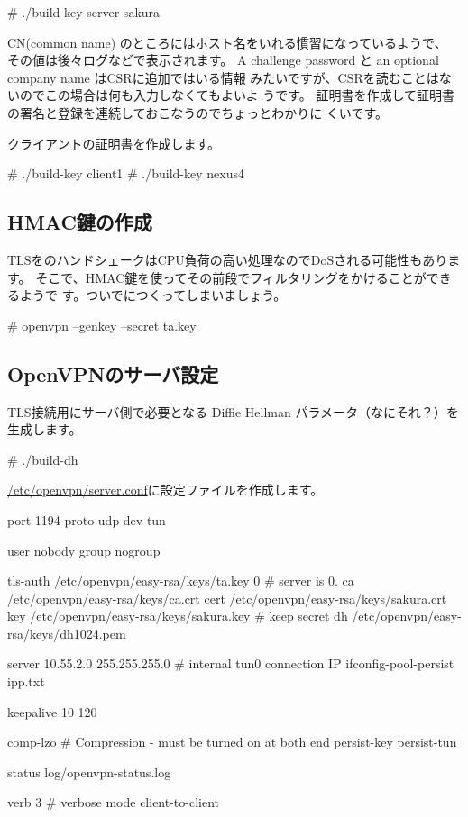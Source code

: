 \documentclass[mingoth,a4paper]{jsarticle}
\begin{document}
\begin{commandline}
 # ./build-key-server sakura
\end{commandline}

CN(common name) のところにはホスト名をいれる慣習になっているようで、
その値は後々ログなどで表示されます。
A challenge password と an optional company name はCSRに追加ではいる情報
みたいですが、CSRを読むことはないのでこの場合は何も入力しなくてもよいよ
うです。
証明書を作成して証明書の署名と登録を連続しておこなうのでちょっとわかりに
くいです。

クライアントの証明書を作成します。
\begin{commandline}
 # ./build-key client1
 # ./build-key nexus4
\end{commandline}

\subsection{HMAC鍵の作成}

TLSをのハンドシェークはCPU負荷の高い処理なのでDoSされる可能性もあります。
そこで、HMAC鍵を使ってその前段でフィルタリングをかけることができるようで
す。ついでにつくってしまいましょう。

\begin{commandline}
 # openvpn --genkey --secret ta.key
\end{commandline}

\subsection{OpenVPNのサーバ設定}

TLS接続用にサーバ側で必要となる Diffie Hellman パラメータ（なにそれ？）を
生成します。

\begin{commandline}
 # ./build-dh  
\end{commandline}

\url{/etc/openvpn/server.conf}に設定ファイルを作成します。

\begin{commandline}
port 1194
proto udp
dev tun

user nobody
group nogroup

tls-auth      /etc/openvpn/easy-rsa/keys/ta.key 0 # server is 0.
ca      /etc/openvpn/easy-rsa/keys/ca.crt
cert    /etc/openvpn/easy-rsa/keys/sakura.crt
key     /etc/openvpn/easy-rsa/keys/sakura.key  # keep secret
dh      /etc/openvpn/easy-rsa/keys/dh1024.pem

server 10.55.2.0 255.255.255.0  # internal tun0 connection IP
ifconfig-pool-persist ipp.txt

keepalive 10 120

comp-lzo         # Compression - must be turned on at both end
persist-key
persist-tun

status log/openvpn-status.log

verb 3  # verbose mode
client-to-client
 
\end{commandline}
\end{document}
